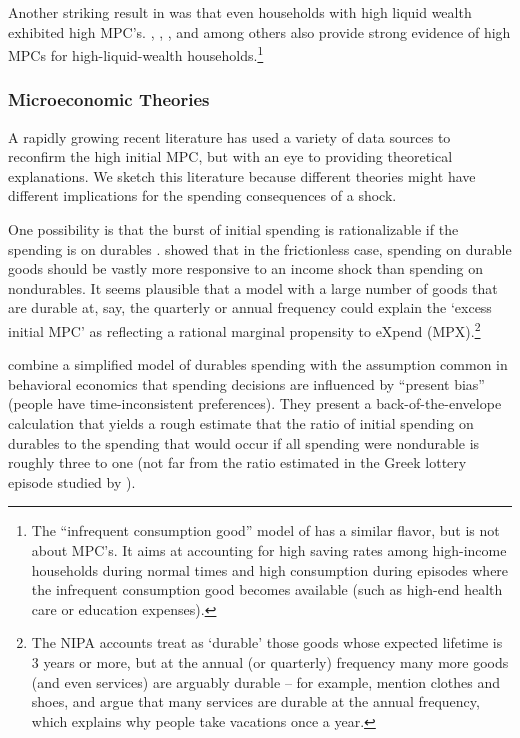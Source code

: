 \documentclass[\econtexRoot/HAFiscal]{subfiles}
\begin{document}

Another striking result in \cite{fagereng_mpc_2021} was that even households with high liquid wealth exhibited high MPC's.  \cite{boehm2025fivefacts}, \cite{graham2024mental}, \cite{crawley2023MicroMacro}, and \cite{kueng2018excess} among others also provide strong evidence of high MPCs for high-liquid-wealth households.\footnote{The ``infrequent consumption good'' model of \cite{melcangiStock} has a similar flavor, but is not about MPC's.  It aims at accounting for high saving rates among high-income households during normal times and high consumption during episodes where the infrequent consumption good becomes available (such as high-end health care or education expenses).}

\hypertarget{microeconomic-theories}{}
\subsubsection{Microeconomic Theories}
A rapidly growing recent literature has used a variety of data sources to reconfirm the high initial MPC, but with an eye to providing theoretical explanations. We sketch this literature because different theories might have different implications for the spending consequences of a shock.


One possibility is that the burst of initial spending is rationalizable if the spending is on durables \citep{bcShocksStocks}.  
\cite{mankiw:durgoods} showed that in the frictionless case, spending on durable goods should be vastly more responsive to an income shock than spending on nondurables. 
It seems plausible that a model with a large number of goods that are durable at, say, the quarterly or annual frequency could explain the `excess initial MPC' as reflecting a rational marginal propensity to eXpend (MPX).\footnote{The NIPA accounts treat as `durable' those goods whose expected lifetime is 3 years or more, but at the annual (or quarterly) frequency many more goods (and even services) are arguably durable -- for example, \cite{bdTimeSeriesC} mention clothes and shoes, and \cite{hkpMemorable} argue that many services are durable at the annual frequency, which explains why people take vacations once a year.}

\cite{lmmPresentBias} combine a simplified model of durables spending with the assumption common in behavioral economics that spending decisions are influenced by ``present bias'' (people have time-inconsistent preferences).  They present a back-of-the-envelope calculation that yields a rough estimate that the ratio of initial spending on durables to the spending that would occur if all spending were nondurable is roughly three to one (not far from the ratio estimated in the Greek lottery episode studied by \cite{kotsogiannisMPCs}).
\end{document}
